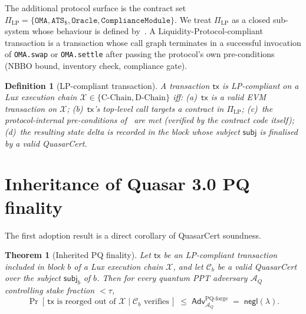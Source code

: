 \documentclass[11pt]{article}
\newtheorem{theorem}{Theorem}
\newtheorem{definition}{Definition}
\begin{document}
The additional protocol surface is the  contract set
$\Pi_{\mathrm{LP}} = \{ \texttt{OMA}, \texttt{ATS}_\$,
\texttt{Oracle}, \texttt{ComplianceModule} \}$.  We treat
$\Pi_{\mathrm{LP}}$ as a closed sub-system whose behaviour is defined
by~\cite{lp-paper}.  A Liquidity-Protocol-compliant transaction is a
transaction whose call graph terminates in a successful invocation of
\texttt{OMA.swap} or \texttt{OMA.settle} after passing the protocol's
own pre-conditions (NBBO bound, inventory check, compliance gate).

\begin{definition}[LP-compliant transaction]
\label{def:lp-compliant}
A transaction $\mathsf{tx}$ is \emph{LP-compliant} on a Lux execution
chain $\mathcal{X} \in \{\text{C-Chain},\text{D-Chain}\}$ iff:
(a)~$\mathsf{tx}$ is a valid EVM transaction on $\mathcal{X}$;
(b)~$\mathsf{tx}$'s top-level call targets a contract in
$\Pi_{\mathrm{LP}}$;
(c)~the protocol-internal pre-conditions of~\cite{lp-paper} are met
(verified by the contract code itself);
(d)~the resulting state delta is recorded in the block whose subject
$\mathsf{subj}$ is finalised by a valid QuasarCert.
\end{definition}

\section{Inheritance of Quasar 3.0 PQ finality}
\label{sec:inherit}

The first adoption result is a direct corollary of QuasarCert
soundness.

\begin{theorem}[Inherited PQ finality]
\label{thm:inherited-finality}
Let $\mathsf{tx}$ be an LP-compliant transaction included in block $b$
of a Lux execution chain $\mathcal{X}$, and let $\mathcal{C}_b$ be a
valid QuasarCert over the subject $\mathsf{subj}_b$ of $b$.  Then for
every quantum PPT adversary $\mathcal{A}_Q$ controlling stake fraction
$<\tau$,
\[
  \Pr[\,\mathsf{tx} \text{ is reorged out of }
       \mathcal{X}\;|\;\mathcal{C}_b\text{ verifies}\,]
  \;\leq\;
  \mathsf{Adv}^{\mathrm{PQ\text{-}forge}}_{\mathcal{A}_Q}
  \;=\; \mathsf{negl}(\lambda).
\]
\end{theorem}
\end{document}
